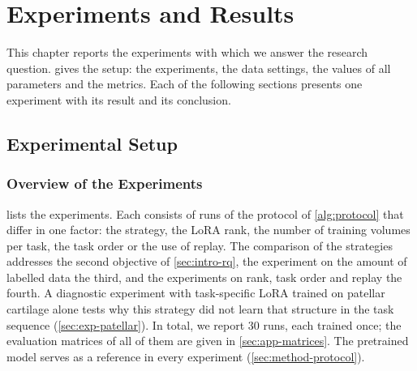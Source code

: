 %

\chapter{Experiments and Results}
\label{chap:experiments}

This chapter reports the experiments with which we answer the research question.
 gives the setup: the experiments, the data settings, the values of all parameters and the metrics.
Each of the following sections presents one experiment with its result and its conclusion.

\section{Experimental Setup}
\label{sec:exp-setup}

\subsection{Overview of the Experiments}
\label{subsec:exp-overview}

 lists the experiments.
Each consists of runs of the protocol of \cref{alg:protocol} that differ in one factor: the strategy, the LoRA rank, the number of training volumes per task, the task order or the use of replay.
The comparison of the strategies addresses the second objective of \cref{sec:intro-rq}, the experiment on the amount of labelled data the third, and the experiments on rank, task order and replay the fourth.
A diagnostic experiment with task-specific LoRA trained on patellar cartilage alone tests why this strategy did not learn that structure in the task sequence (\cref{sec:exp-patellar}).
In total, we report 30 runs, each trained once; the evaluation matrices of all of them are given in \cref{sec:app-matrices}.
The pretrained model serves as a reference in every experiment (\cref{sec:method-protocol}).

